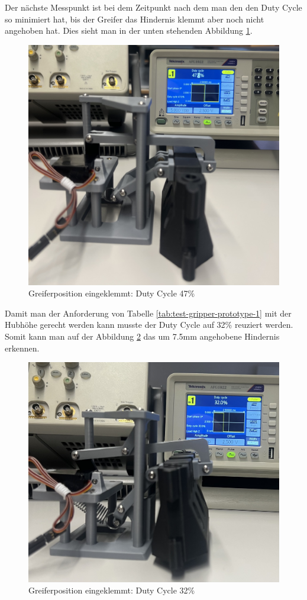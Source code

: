 \newpage

Der nächste Messpunkt ist bei dem Zeitpunkt nach dem man den den Duty Cycle so minimiert hat, bis der Greifer das Hindernis klemmt aber noch nicht angehoben hat. Dies sieht man in der unten stehenden Abbildung \ref{fig: Greiferposition eingeklemmt: Duty Cycle 47}.


\begin{figure}[H]
    \centering
    \includegraphics[width=0.8\linewidth]{img/ServoGreiferKlemmt.jpeg}
    \caption{Greiferposition eingeklemmt: Duty Cycle 47\%}
    \label{fig: Greiferposition eingeklemmt: Duty Cycle 47}
\end{figure}


\newpage

Damit man der Anforderung von Tabelle \ref{tab:test-gripper-prototype-1} mit der Hubhöhe gerecht werden kann musste der Duty Cycle auf 32\% reuziert werden. Somit kann man auf der Abbildung \ref{fig: Greiferposition angehoben: Duty Cycle 32} das um 7.5mm angehobene Hindernis erkennen.

\begin{figure}[H]
    \centering
    \includegraphics[width=0.8\linewidth]{img/ServoHindernisAngehoben.jpeg}
    \caption{Greiferposition eingeklemmt: Duty Cycle 32\%}
    \label{fig: Greiferposition angehoben: Duty Cycle 32}
\end{figure}